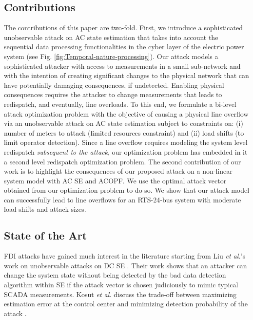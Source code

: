 \documentclass[twocolumn,english,final,journal]{IEEEtran}
\theoremstyle{plain}
\theoremstyle{definition}
\begin{document}
\subsection{Contributions}

The contributions of this paper are two-fold. First, we introduce
a sophisticated unobservable attack on AC state estimation that takes
into account the sequential data processing functionalities in the
cyber layer of the electric power system (see Fig. \ref{fig:Temporal-nature-processing}). Our attack
models a sophisticated attacker with access to measurements in a small
sub-network and with the intention of creating significant changes
to the physical network that can have potentially damaging consequences,
if undetected. Enabling physical consequences requires the attacker to change measurements that leads to redispatch,
and eventually, line overloads. To this end, we formulate a bi-level attack
optimization problem with the objective of causing a physical line
overflow via an unobservable attack on AC state estimation subject
to constraints on: (i) number of meters to attack (limited resources
constraint) and (ii) load shifts (to limit operator detection).
Since a line overflow requires modeling the system level redispatch
\textit{subsequent to the attack}, our optimization problem has embedded
in it a second level redispatch optimization problem. The second contribution
of our work is to highlight the consequences of our proposed attack
on a non-linear system model with AC SE and ACOPF. We use the optimal
attack vector obtained from our optimization problem to do so. We
show that our attack model can successfully lead to line overflows
for an RTS-24-bus system with moderate load shifts and attack sizes.


\subsection{State of the Art}

FDI attacks have gained much interest in the literature starting from
Liu \textit{et al.}'s work on unobservable attacks on DC SE .
Their work shows that an attacker can change the system state without being detected by the bad data detection algorithm
within SE if the attack vector is chosen judiciously to mimic typical
SCADA measurements. Kosut \textit{et al.} discuss the trade-off between
maximizing estimation error at the control center and minimizing detection
probability of the attack . 
\end{document}
